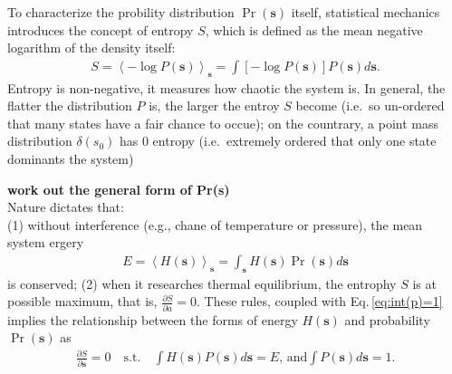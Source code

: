 \documentclass[11pt]{book}
\def\style{apa}
\numberwithin{equation}{chapter}
\newcommand{\bs}{\boldsymbol}
\newcommand{\mean}[2]{\left\langle{#1}\right\rangle_{#2}}
\newcommand{\vs}{\bs{s}}
\newcommand{\PDV}[2]{\frac{\partial #1}{\partial #2}}
\begin{document}
To characterize the probility distribution $\Pr(\vs)$ itself, statistical mechanics introduces the concept of entropy $S$, which is defined as the mean negative logarithm of the density itself:
\begin{align}
  S = \mean{-\log{P(\vs)}}{\vs} = \int{[-\log{P(\vs)}]P(\vs)d\vs}.
\end{align}
Entropy is non-negative, it measures how chaotic the system is. In general, the flatter the distribution $P$ is, the larger the entroy $S$ become (i.e.\, so un-ordered that many states have a fair chance to occue); on the countrary, a point mass distribution $\delta(s_0)$ has 0 entropy (i.e.\, extremely ordered that only one state dominants the system)

\textbf{work out the general form of Pr(\textbf{s})} \\
Nature dictates that:\\
(1) without interference (e.g., chane of temperature or pressure), the mean system ergery
\begin{align}
  E = \mean{H(\vs)}{\vs} = \int_{\vs} H(\vs)\Pr(\vs) d\vs
\end{align}
is conserved; 
(2) when it researches thermal equilibrium, the entrophy $S$ is at possible maximum, that is, $\PDV{S}{a}=0$. These rules, coupled with Eq.\,\eqref{eq:int(p)=1} implies the relationship between the forms of energy $H(\vs)$ and probability $\Pr(\vs)$ as
\begin{equation}
  \begin{split}
    \PDV{S}{\vs} = 0 
    \quad\textrm{s.t.}\quad\int{H(\vs)P(\vs)d\vs} = E \textrm{, and} \int{P(\vs)d\vs} = 1.
  \end{split}
\end{equation}

\clearpage
\singlespacing


%
\end{document}
